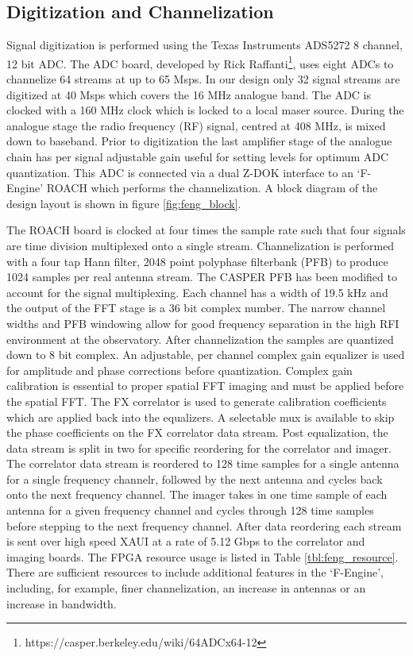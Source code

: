 \documentclass[useAMS,macros,usenatbib,onecolumn]{mn2e}
\begin{document}
\subsection{Digitization and Channelization}
\label{channelization}

Signal digitization is performed using the Texas Instruments ADS5272 8 channel, 12 bit ADC.
The ADC board, developed by Rick Raffanti\footnote{https://casper.berkeley.edu/wiki/64ADCx64-12}, uses eight ADCs to channelize 64 streams at up to 65 Msps.
In our design only 32 signal streams are digitized at 40 Msps which covers the 16 MHz analogue band.
The ADC is clocked with a 160 MHz clock which is locked to a local maser source.
During the analogue stage the radio frequency (RF) signal, centred at 408 MHz, is mixed down to baseband.
Prior to digitization the last amplifier stage of the analogue chain has per signal adjustable gain useful for setting levels for optimum ADC quantization.
This ADC is connected via a dual Z-DOK interface to an `F-Engine' ROACH which performs the channelization.
A block diagram of the design layout is shown in figure \ref{fig:feng_block}.

The ROACH board is clocked at four times the sample rate such that four signals are time division multiplexed onto a single stream.
Channelization is performed with a four tap Hann filter, 2048 point polyphase filterbank (PFB) to produce 1024 samples per real antenna stream.
The CASPER PFB has been modified to account for the signal multiplexing.
Each channel has a width of 19.5 kHz and the output of the FFT stage is a 36 bit complex number.
The narrow channel widths and PFB windowing allow for good frequency separation in the high RFI environment at the observatory.
After channelization the samples are quantized down to 8 bit complex.
An adjustable, per channel complex gain equalizer is used for amplitude and phase corrections before quantization.
Complex gain calibration is essential to proper spatial FFT imaging and must be applied before the spatial FFT.
The FX correlator is used to generate calibration coefficients which are applied back into the equalizers.
A selectable mux is available to skip the phase coefficients on the FX correlator data stream.
Post equalization, the data stream is split in two for specific reordering for the correlator and imager.
The correlator data stream is reordered to 128 time samples for a single antenna for a single frequency channelr, followed by the next antenna and cycles back onto the next frequency channel.
The imager takes in one time sample of each antenna for a given frequency channel and cycles through 128 time samples before stepping to the next frequency channel.
After data reordering each stream is sent over high speed XAUI at a rate of 5.12 Gbps to the correlator and imaging boards.
The FPGA resource usage is listed in Table \ref{tbl:feng_resource}.
There are sufficient resources to include additional features in the `F-Engine', including, for example, finer channelization, an increase in antennas or an increase in bandwidth.
\end{document}

